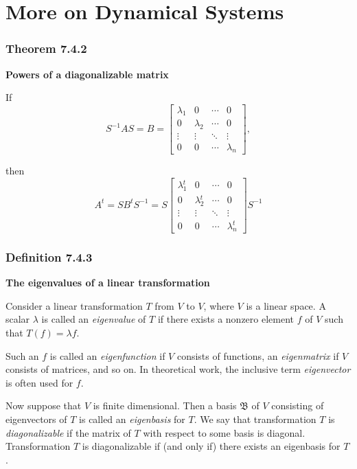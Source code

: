 \documentclass{report}
\begin{document}
\section{More on Dynamical Systems}
\subsubsection*{Theorem 7.4.2}
\par\noindent\textbf{Powers of a diagonalizable matrix}
\par\noindent If
\[S^{-1}AS=B=\left[\begin{array}{cccc}\lambda{}_{1}&0&\cdots{}&0\\ 0&\lambda{}_{2}&\cdots{}&0\\ \vdots{}&\vdots{}&\ddots{}&\vdots{}\\ 0&0&\cdots{}&\lambda{}_{n}\end{array}\right],\]
\par\noindent then
\[A^{t}=SB^{t}S^{-1}=S\left[\begin{array}{cccc}\lambda{}_{1}^{t}&0&\cdots{}&0\\ 0&\lambda{}_{2}^{t}&\cdots{}&0\\ \vdots{}&\vdots{}&\ddots{}&\vdots{}\\ 0&0&\cdots{}&\lambda{}_{n}^{t}\end{array}\right]S^{-1}\]
\subsubsection*{Definition 7.4.3}
\par\noindent\textbf{The eigenvalues of a linear transformation}
\par\noindent Consider a linear transformation $T$ from $V$ to $V$, where $V$ is a linear space. A scalar $\lambda{}$ is called an \textit{eigenvalue} of $T$ if there exists a nonzero element $f$ of $V$ such that $T(f)=\lambda{}f$.
\par Such an $f$ is called an \textit{eigenfunction} if $V$ consists of functions, an \textit{eigenmatrix} if $V$ consists of matrices, and so on. In theoretical work, the inclusive term \textit{eigenvector} is often used for $f$.
\par Now suppose that $V$ is finite dimensional. Then a basis $\mathfrak{B}$ of $V$ consisting of eigenvectors of $T$ is called an \textit{eigenbasis} for $T$. We say that transformation $T$ is \textit{diagonalizable} if the matrix of $T$ with respect to some basis is diagonal. Transformation $T$ is diagonalizable if (and only if) there exists an eigenbasis for $T$.
\end{document}

